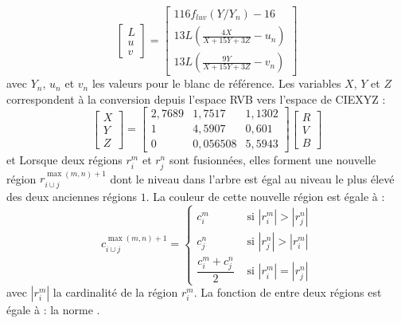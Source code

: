 \begin{equation}
\begin{bmatrix}
L \\ u \\ v
\end{bmatrix}
=
\begin{bmatrix}
 116f_{luv}(Y/Y_{n}) - 16 \\
 13L(\frac{4X}{X+15Y+3Z} -u_{n}) \\
 13L(\frac{9Y}{X+15Y+3Z} - v_{n})
\end{bmatrix}
\end{equation}
avec  $Y_{n}$, $u_{n}$ et $v_{n}$ les valeurs pour le blanc de référence. Les variables  $X$, $Y$ et $Z$ correspondent à la conversion depuis l'espace RVB vers l'espace de CIEXYZ :
\begin{equation}
\begin{bmatrix}
X \\ Y \\ Z
\end{bmatrix}
= 
\begin{bmatrix}
 2,7689 & 1,7517 & 1,1302 \\
 1 & 4,5907 & 0,601 \\
 0 & 0,056508 &5,5943
\end{bmatrix}
\begin{bmatrix}
R \\ V \\ B
\end{bmatrix}
\end{equation} et 
Lorsque deux régions $r_{i}^{m}$  et $r_{j}^{n}$ sont fusionnées, elles forment une nouvelle région $r _{i \cup j}^{\max(m,n)+1}$ dont le niveau dans l'arbre est égal au niveau le plus élevé des deux anciennes régions  $1$. La couleur de cette nouvelle région est égale à :
\begin{equation}
c_{i \cup j}^{\max(m,n)+1} = \begin{cases}  c_{i}^{m} &\text{ si } |r_{i}^{m}| >  |r_{j}^{n}| \\
 c_{j}^{n} &\text{ si } |r_{j}^{n}| >  |r_{i}^{m}| \\
 \dfrac{c_{i}^{m}+c_{j}^{n}}{2} &\text{ si } |r_{i}^{m}| =  |r_{j}^{n}| 
\end{cases}
\end{equation}
avec $|r_{i}^{m}|$ la cardinalité de la région $r_{i}^{m}$. La fonction de  entre deux régions est égale à :
 la norme .



